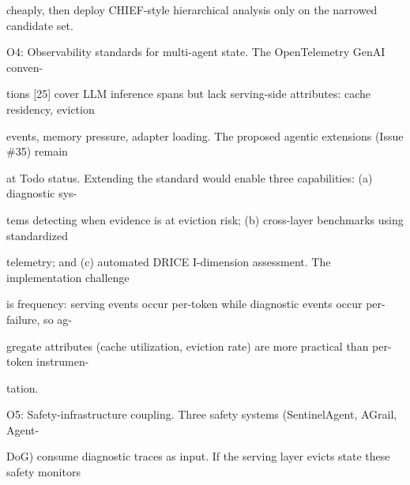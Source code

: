 \begin{flushleft}
\noindent cheaply, then deploy CHIEF-style hierarchical analysis only on the narrowed candidate set.\par
\par\smallskip
\noindent O4: Observability standards for multi-agent state. The OpenTelemetry GenAI conven-\par
\noindent tions [25] cover LLM inference spans but lack serving-side attributes: cache residency, eviction\par
\noindent events, memory pressure, adapter loading. The proposed agentic extensions (Issue \#35) remain\par
\noindent at Todo status. Extending the standard would enable three capabilities: (a) diagnostic sys-\par
\noindent tems detecting when evidence is at eviction risk; (b) cross-layer benchmarks using standardized\par
\noindent telemetry; and (c) automated DRICE I-dimension assessment. The implementation challenge\par
\noindent is frequency: serving events occur per-token while diagnostic events occur per-failure, so ag-\par
\noindent gregate attributes (cache utilization, eviction rate) are more practical than per-token instrumen-\par
\noindent tation.\par
\par\smallskip
\noindent O5: Safety-infrastructure coupling. Three safety systems (SentinelAgent, AGrail, Agent-\par
\noindent DoG) consume diagnostic traces as input. If the serving layer evicts state these safety monitors\par
\end{flushleft}
